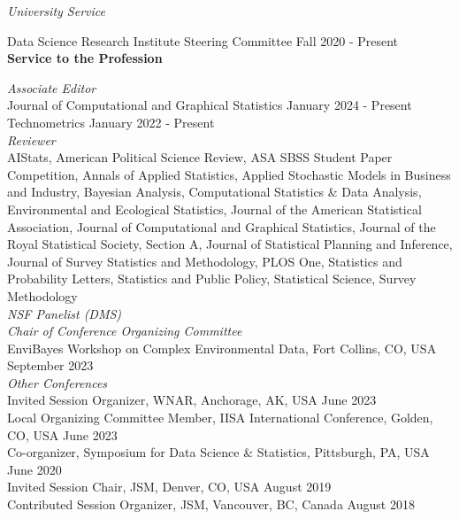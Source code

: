 \documentclass[margin,line]{res}
\begin{document}
\begin{resume}
\vspace{-.3cm}
{\em University Service}

\vspace{-.3cm}
Data Science Research Institute Steering Committee \hfill {Fall 2020 - Present} \\

{\bf Service to the Profession}

\vspace{-.3cm}
{\em Associate Editor}  \\
\vspace{-.3cm}
Journal of Computational and Graphical Statistics \hfill {January 2024 - Present} \\
Technometrics \hfill {January 2022 - Present} \\



{\em Reviewer} \\
AIStats, American Political Science Review, ASA SBSS Student Paper Competition, Annals of Applied Statistics, Applied Stochastic Models in Business and Industry, Bayesian Analysis, Computational Statistics \& Data Analysis, Environmental and Ecological Statistics, Journal of the American Statistical Association, Journal of Computational and Graphical Statistics, Journal of the Royal Statistical Society, Section A, Journal of Statistical Planning and Inference, Journal of Survey Statistics and Methodology, PLOS One, Statistics and Probability Letters, Statistics and Public Policy, Statistical Science, Survey Methodology \\

\vspace{-.3cm}
{\em NSF Panelist (DMS)} \\

\vspace{-.3cm}
{\em Chair of Conference Organizing Committee} \\
EnviBayes Workshop on Complex Environmental Data, Fort Collins, CO, USA \hfill {September 2023} \\

\vspace{-.3cm}
{\em Other Conferences} \\
Invited Session Organizer, WNAR, Anchorage, AK, USA \hfill {June 2023} \\
Local Organizing Committee Member,  IISA International Conference, Golden, CO, USA \hfill {June 2023} \\
Co-organizer, Symposium for Data Science \& Statistics, Pittsburgh, PA, USA \hfill {June 2020} \\
Invited Session Chair, JSM, Denver, CO, USA \hfill {August 2019} \\
Contributed Session Organizer, JSM, Vancouver, BC, Canada \hfill {August 2018}


\end{resume}
\end{document}

